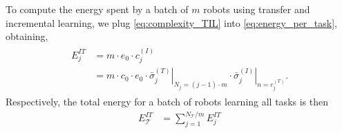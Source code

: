 To compute the energy spent by a batch of $m$ robots using transfer and incremental learning, we plug \eqref{eq:complexity_TIL} into \eqref{eq:energy_per_task}, obtaining,
\begin{align}\label{eq:itl_energy_per_task}
\begin{split}
    E^{IT}_j &= m \cdot e_0 \cdot c^{(I)}_j\\
    &= m \cdot c_0 \cdot e_0 \cdot \left.\bar{\sigma}^{(T)}_j \right\vert_{N_j = (j-1)\cdot m} \cdot \left.{\bar{\sigma}^{(I)}_j}\right\vert_{n = c^{(T)}_j}.
\end{split}    
\end{align}
Respectively, the total energy for a batch of robots learning all tasks is then
\begin{align}\label{eq:itl_total_energy}
  E^{IT}_{\mathcal{T}} &= \sum^{{N_{\mathcal{T}}}/{m}}_{j=1} E^{IT}_j
\end{align}

